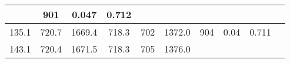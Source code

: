 \documentclass[a4paper,10pt]{article}
\begin{document}
\begin{longtable}{
     |
%    
    c|
%    
    c|
%    
    c|
%    
    c|
%    
    c|
%    
    c|
%    
    c|
%    
    c|
%    
    c|
%    
    c|
%    
    }
%        
        & 901
%        

%        

%        
        & 0.047
%        

%        

%        
        & 0.712
%        

%        
        \\
        \hline

        

%        

%        
        135.1
%        

%        

%        
        & 720.7
%        

%        

%        
        & 1669.4
%        

%        

%        
        & 718.3
%        

%        

%        
        & 702
%        

%        

%        
        & 1372.0
%        

%        

%        
        & 904
%        

%        

%        
        & 0.04
%        

%        

%        
        & 0.711
%        

%        
        \\
        \hline

        

%        

%        
        143.1
%        

%        

%        
        & 720.4
%        

%        

%        
        & 1671.5
%        

%        

%        
        & 718.3
%        

%        

%        
        & 705
%        

%        

%        
        & 1376.0
%        

%        


\end{longtable}
\end{document}
